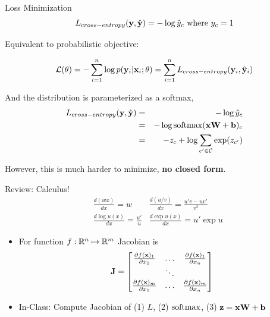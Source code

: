 \documentclass{beamer}
\begin{document}
\begin{frame}{Loss Minimization}
    \[ L_{cross-entropy}(\mathbf{y}, \hat{\mathbf{y}})=  - \log \hat{y}_c \mathrm{\ where\ }y_c = 1   \]

  Equivalent to probabilistic objective:

  \[ \mathcal{L}(\theta) =  - \sum_{i=1}^n \log p(\mathbf{y}_i | \mathbf{x}_i; \theta) = \sum_{i=1}^n L_{cross-entropy}(\mathbf{y}_i, \hat{\mathbf{y}}_i) \] 


  And the distribution is parameterized as a softmax,
  \begin{eqnarray*}
    L_{cross-entropy}(\boldy, \hat{\boldy}) &=& - \log \hat{y}_c\\
    &=& -\log \softmax(\boldx \boldW + \bold b)_c \\
    &=& - z_c + \log \sum_{c' \in \mcC} \exp(z_{c'}) 
  \end{eqnarray*}

  However, this is much harder to minimize, \textbf{no closed form}.
  
\end{frame}



\begin{frame}{Review: Calculus!}
  \begin{align*} 
    &\frac{d (w x)  }{d x} = w   & \frac{d (u/v) }{d x} = \frac{u'v -   uv'} {v^2}  \\
   &\frac{d \log u(x) }{d x} = \frac{u'}{u}  & \frac{d \exp u(x) }{d x} =  u' \exp u  
  \end{align*}

  \begin{itemize}
  \item For function $f: \mathbb{R}^n \mapsto \mathbb{R}^m $ Jacobian is 
    \[ \mathbf{J} = \begin{bmatrix} \frac{\partial f(\mathbf{x})_1}{\partial x_1} & \ldots&  \frac{\partial f(\mathbf{x})_1}{\partial x_n} \\ 
      &\ddots& \\
      \frac{\partial f(\mathbf{x})_m}{\partial x_1} & \ldots &  \frac{\partial f(\mathbf{x})_m}{\partial x_n} \\ 
    \end{bmatrix}\]

     \item In-Class: Compute Jacobian of (1) $L$,  (2) $\softmax$, (3) $\mathbf{z} = \mathbf{x} \mathbf{W} + \mathbf{b}$ 
  \end{itemize}
  
  
\end{frame}
\end{document}
